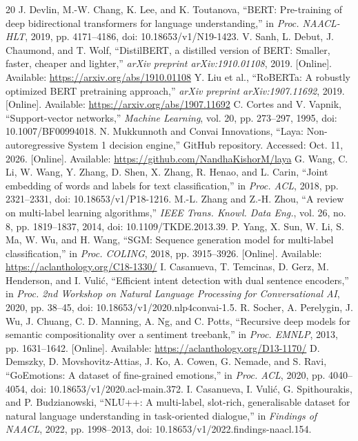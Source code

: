 \documentclass[conference]{IEEEtran}
\begin{document}
\begin{thebibliography}{20}
J. Devlin, M.-W. Chang, K. Lee, and K. Toutanova, ``BERT: Pre-training of deep bidirectional transformers for language understanding,'' in \emph{Proc. NAACL-HLT}, 2019, pp. 4171--4186, doi: 10.18653/v1/N19-1423.
V. Sanh, L. Debut, J. Chaumond, and T. Wolf, ``DistilBERT, a distilled version of BERT: Smaller, faster, cheaper and lighter,'' \emph{arXiv preprint arXiv:1910.01108}, 2019. [Online]. Available: \url{https://arxiv.org/abs/1910.01108}
Y. Liu et al., ``RoBERTa: A robustly optimized BERT pretraining approach,'' \emph{arXiv preprint arXiv:1907.11692}, 2019. [Online]. Available: \url{https://arxiv.org/abs/1907.11692}
C. Cortes and V. Vapnik, ``Support-vector networks,'' \emph{Machine Learning}, vol. 20, pp. 273--297, 1995, doi: 10.1007/BF00994018.
N. Mukkunnoth and Convai Innovations, ``Laya: Non-autoregressive System 1 decision engine,'' GitHub repository. Accessed: Oct. 11, 2026. [Online]. Available: \url{https://github.com/NandhaKishorM/laya}
G. Wang, C. Li, W. Wang, Y. Zhang, D. Shen, X. Zhang, R. Henao, and L. Carin, ``Joint embedding of words and labels for text classification,'' in \emph{Proc. ACL}, 2018, pp. 2321--2331, doi: 10.18653/v1/P18-1216.
M.-L. Zhang and Z.-H. Zhou, ``A review on multi-label learning algorithms,'' \emph{IEEE Trans. Knowl. Data Eng.}, vol. 26, no. 8, pp. 1819--1837, 2014, doi: 10.1109/TKDE.2013.39.
P. Yang, X. Sun, W. Li, S. Ma, W. Wu, and H. Wang, ``SGM: Sequence generation model for multi-label classification,'' in \emph{Proc. COLING}, 2018, pp. 3915--3926. [Online]. Available: \url{https://aclanthology.org/C18-1330/}
I. Casanueva, T. Temcinas, D. Gerz, M. Henderson, and I. Vuli\'{c}, ``Efficient intent detection with dual sentence encoders,'' in \emph{Proc. 2nd Workshop on Natural Language Processing for Conversational AI}, 2020, pp. 38--45, doi: 10.18653/v1/2020.nlp4convai-1.5.
R. Socher, A. Perelygin, J. Wu, J. Chuang, C. D. Manning, A. Ng, and C. Potts, ``Recursive deep models for semantic compositionality over a sentiment treebank,'' in \emph{Proc. EMNLP}, 2013, pp. 1631--1642. [Online]. Available: \url{https://aclanthology.org/D13-1170/}
D. Demszky, D. Movshovitz-Attias, J. Ko, A. Cowen, G. Nemade, and S. Ravi, ``GoEmotions: A dataset of fine-grained emotions,'' in \emph{Proc. ACL}, 2020, pp. 4040--4054, doi: 10.18653/v1/2020.acl-main.372.
I. Casanueva, I. Vuli\'{c}, G. Spithourakis, and P. Budzianowski, ``NLU++: A multi-label, slot-rich, generalisable dataset for natural language understanding in task-oriented dialogue,'' in \emph{Findings of NAACL}, 2022, pp. 1998--2013, doi: 10.18653/v1/2022.findings-naacl.154.

\end{thebibliography}
\end{document}
